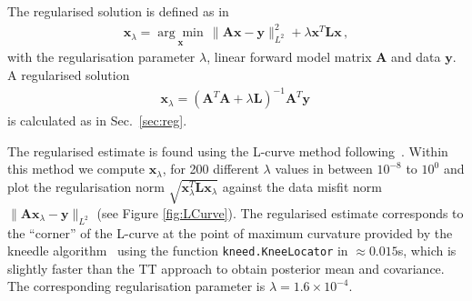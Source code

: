The regularised solution is defined as in~\cite{hansen2010discrete, fox2016fast} 
\begin{align}
	\bm{x}_{\lambda} =\underset{ \bm{x}}{\arg \min}\,  \lVert \bm{A}\bm{x} - \bm{y} \rVert_{L^2}^2 + \lambda \bm{x}^T \bm{L} \bm{x} \, ,
	\label{eq:XLam}
\end{align}
with the regularisation parameter $\lambda$, linear forward model matrix $\bm{A}$ and data $\bm{y}$.
A regularised solution
\begin{align}
	\bm{x}_{\lambda} = (\bm{A}^T\bm{A} + \lambda \bm{L} )^{-1} \bm{A}^T \bm{y} \label{eq:xLam} \, 
\end{align}
is calculated as in Sec.~\ref{sec:reg}.

The regularised estimate is found using the L-curve method following~\cite{hansen1993use}.
Within this method we compute $\bm{x}_\lambda$, for 200 different $\lambda$ values in between $10^{-8}$ to $10^{0}$ and plot the regularisation norm $\sqrt{\bm{x}_\lambda^T\mathbf{L} \bm{x}_\lambda}$ against the data misfit norm $\lVert \bm{A}\bm{x}_\lambda - \bm{y} \rVert_{L^2}$ (see Figure \ref{fig:LCurve}). 
The regularised estimate corresponds to the ``corner'' of the L-curve at the point of maximum curvature provided by the kneedle algorithm~\cite{satopaa2011kneedle} using the function \texttt{kneed.KneeLocator} in $\approx 0.015$s, which is slightly faster than the TT approach to obtain posterior mean and covariance.
The corresponding regularisation parameter is $\lambda = 1.6 \times 10^{-4}$.


